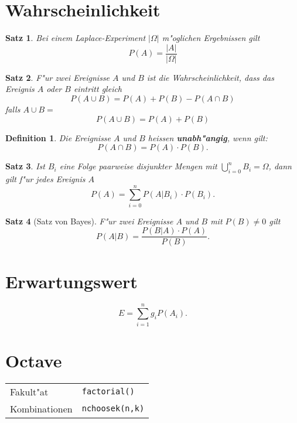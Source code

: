 \documentclass[ngerman, a4paper, 10pt, twocolumn, DIV20, headings=small]{scrartcl}
\newtheorem{definition}{Definition}
\newtheorem{satz}{Satz}
\begin{document}
\section{Wahrscheinlichkeit}
\label{sec:wahrscheinlichkeit}

\begin{satz}
  Bei einem Laplace-Experiment $| \Omega |$ m"oglichen Ergebnissen gilt
\[
P(A) = \frac{|A|}{|\Omega|}
\]
\end{satz}

\begin{satz}
F"ur zwei Ereignisse $A$ und $B$ ist die Wahrscheinlichkeit, dass das Ereignis $A$ oder $B$ eintritt gleich
\[
P(A\cup B) = P(A) + P(B) - P(A\cap B)
\]
falls $ A \cup B = {} $
\[
P(A\cup B) = P(A) + P(B)
\]
\end{satz}

\begin{definition}
Die Ereignisse $A$ und $B$ heissen {\bf unabh"angig}, wenn gilt:
\[
P(A\cap B) = P(A)\cdot P(B).
\]
\end{definition}

\begin{satz}
Ist $B_i$ eine Folge paarweise disjunkter Mengen mit $\bigcup_{i=0}^{n}B_i=\Omega$, dann gilt f"ur jedes Ereignis $A$
\[
P(A)=\sum_{i=0}^{n}P(A|B_i)\cdot P(B_i).
\]
\end{satz}

\begin{satz}[Satz von Bayes]
F"ur zwei Ereignisse $A$ und $B$ mit $P(B)\ne0$ gilt
\[
P(A|B)=\frac{P(B|A)\cdot P(A)}{P(B)}.
\]
\end{satz}

\section{Erwartungswert}
\label{sec:erwartungswert}

\[
E=\sum_{i=1}^{n}g_iP(A_i).
\]
\section{Octave}
\label{sec:octave}

\begin{tabular}{l l}
  Fakult"at & \verb|factorial()| \\
  Kombinationen & \verb|nchoosek(n,k)| \\
\end{tabular}
\end{document}
